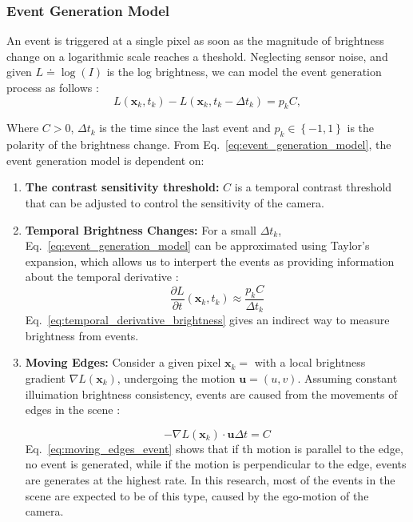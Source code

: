 \documentclass{article}
\begin{document}
\subsubsection{Event Generation Model}
An event is triggered at a single pixel as soon as the magnitude of brightness change on a logarithmic scale reaches a theshold. Neglecting sensor noise, and given $L\doteq \log(I)$ is the log brightness, we can model the event generation process as follows \cite{gallegoEventbasedVisionSurvey2022}:
\begin{equation}
    L(\textbf{x}_k,t_k) - L(\textbf{x}_k,t_k-\Delta t_k) = p_k C,
    \label{eq:event_generation_model}
\end{equation}
    
Where $C>0$, $\Delta t_k$ is the time since the last event and $p_k \in \left\{-1,1\right\}$ is the polarity of the brightness change. From Eq.~\eqref{eq:event_generation_model}, the event generation model is dependent on:

\begin{enumerate}
    \item \textbf{The contrast sensitivity threshold:} $C$ is a temporal contrast threshold that can be adjusted to control the sensitivity of the camera.
    \item \textbf{Temporal Brightness Changes:} For a small $\Delta t_k$, Eq.~\eqref{eq:event_generation_model} can be approximated using Taylor's expansion, which allows us to interpert the events as providing information about the temporal derivative \cite{gallegoEventbasedVisionSurvey2022}:
        \begin{equation}
            \frac{\partial L}{\partial t}(\textbf{x}_k,t_k) \approx \frac{p_k C}{\Delta t_k}
            \label{eq:temporal_derivative_brightness}
        \end{equation}
    Eq.~\eqref{eq:temporal_derivative_brightness} gives an indirect way to measure brightness from events.
    \item \textbf{Moving Edges:} Consider a given pixel $\textbf{x}_k=$ with a local brightness gradient $\nabla L(\textbf{x}_k)$, undergoing the motion $\textbf{u}=(u,v)$. Assuming constant illuimation brightness consistency, events are caused from the movements of edges in the scene \cite{gallegoEventbasedVisionSurvey2022, gallegoEventbasedCameraPose2015}:
    
        \begin{equation}
            -\nabla L(\textbf{x}_k) \cdot \textbf{u}\Delta t = C
            \label{eq:moving_edges_event}
        \end{equation}
    Eq.~\eqref{eq:moving_edges_event} shows that if th motion is parallel to the edge, no event is generated, while if the motion is perpendicular to the edge, events are generates at the highest rate. 
    In this research, most of the events in the scene are expected to be of this type, caused by the ego-motion of the camera.
    
\end{enumerate}
\end{document}

